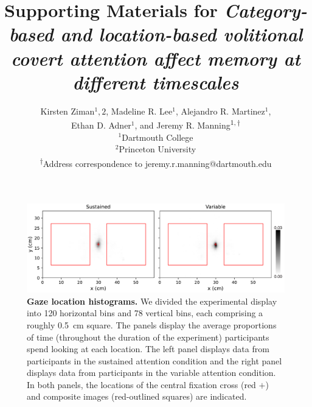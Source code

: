 \documentclass{article}
\begin{document}
\title{Supporting Materials for \textit{Category-based and location-based volitional covert attention affect
memory at different timescales}}

\author{Kirsten Ziman$^1, 2$,
Madeline R. Lee$^1$,
Alejandro R. Martinez$^1$,\\
Ethan D. Adner$^1$,
and
Jeremy R. Manning\textsuperscript{$1, \dagger$}\\[0.1in]$^1$Dartmouth College\\
$^2$Princeton University\\
\textsuperscript{$\dagger$}Address correspondence to jeremy.r.manning@dartmouth.edu}


\maketitle


\renewcommand{\thefigure}{S\arabic{figure}}


  \begin{figure}[tp]
	\centering
	\includegraphics[width=1\textwidth]{figs/gaze_locations}
  
 \caption{\textbf{Gaze location histograms.} We divided the experimental
 display into 120 horizontal bins and 78 vertical bins, each comprising a
 roughly 0.5~cm square. The panels display the average proportions of time
 (throughout the duration of the experiment) participants spend looking at each
 location. The left panel displays data from participants in the sustained
 attention condition and the right panel displays data from participants in the
 variable attention condition. In both panels, the locations of the central
 fixation cross (red $+$) and composite images (red-outlined squares) are
 indicated.}
  
  \label{fig:gaze-histograms}
  \end{figure}
\end{document}
